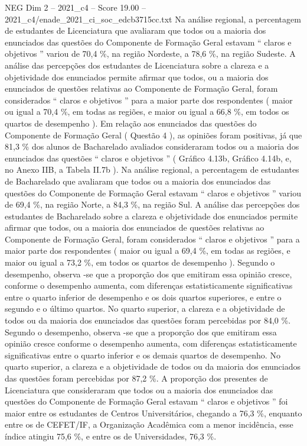\begin{textsample}{NEG Dim 2 – 2021\_c4 – Score 19.00 – 2021\_c4/enade\_2021\_ci\_soc\_edcb3715cc.txt}
Na análise regional, a percentagem de estudantes de Licenciatura que avaliaram que todos ou a maioria dos enunciados das questões do Componente de Formação Geral estavam “ claros e objetivos ” variou de 70,4 \%, na região Nordeste, a 78,6 \%, na região Sudeste.
A análise das percepções dos estudantes de Licenciatura sobre a clareza e a objetividade dos enunciados permite afirmar que todos, ou a maioria dos enunciados de questões relativas ao Componente de Formação Geral, foram considerados “ claros e objetivos ” para a maior parte dos respondentes ( maior ou igual a 70,4 \%, em todas as regiões, e maior ou igual a 66,8 \%, em todos os quartos de desempenho ).
Em relação aos enunciados das questões do Componente de Formação Geral ( Questão 4 ), as opiniões foram positivas, já que 81,3 \% dos alunos de Bacharelado avaliados consideraram todos ou a maioria dos enunciados das questões “ claros e objetivos ” ( Gráfico 4.13b, Gráfico 4.14b, e, no Anexo IIB, a Tabela II.7b ).
Na análise regional, a percentagem de estudantes de Bacharelado que avaliaram que todos ou a maioria dos enunciados das questões do Componente de Formação Geral estavam “ claros e objetivos ” variou de 69,4 \%, na região Norte, a 84,3 \%, na região Sul.
A análise das percepções dos estudantes de Bacharelado sobre a clareza e objetividade dos enunciados permite afirmar que todos, ou a maioria dos enunciados de questões relativas ao Componente de Formação Geral, foram considerados “ claros e objetivos ” para a maior parte dos respondentes ( maior ou igual a 69,4 \%, em todas as regiões, e maior ou igual a 73,2 \%, em todos os quartos de desempenho ).
Segundo o desempenho, observa -se que a proporção dos que emitiram essa opinião cresce, conforme o desempenho aumenta, com diferenças estatisticamente significativas entre o quarto inferior de desempenho e os dois quartos superiores, e entre o segundo e o último quartos.
No quarto superior, a clareza e a objetividade de todos ou da maioria dos enunciados das questões foram percebidas por 84,0 \%.
Segundo o desempenho, observa -se que a proporção dos que emitiram essa opinião cresce conforme o desempenho aumenta, com diferenças estatisticamente significativas entre o quarto inferior e os demais quartos de desempenho.
No quarto superior, a clareza e a objetividade de todos ou da maioria dos enunciados das questões foram percebidas por 87,2 \%.
A proporção dos presentes de Licenciatura que consideraram que todos ou a maioria dos enunciados das questões do Componente de Formação Geral estavam “ claros e objetivos ” foi maior entre os estudantes de Centros Universitários, chegando a 76,3 \%, enquanto entre os de CEFET/IF, a Organização Acadêmica com a menor incidência, esse índice atingiu 75,6 \%, e entre os de Universidades, 76,3 \%.

\end{textsample}
